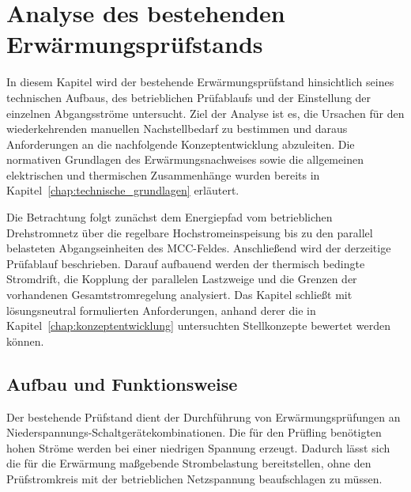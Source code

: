 \section{Analyse des bestehenden Erwärmungsprüfstands}
\label{chap:analyse_pruefstand}

In diesem Kapitel wird der bestehende Erwärmungsprüfstand hinsichtlich seines
technischen Aufbaus, des betrieblichen Prüfablaufs und der Einstellung der
einzelnen Abgangsströme untersucht. Ziel der Analyse ist es, die Ursachen für
den wiederkehrenden manuellen Nachstellbedarf zu bestimmen und daraus
Anforderungen an die nachfolgende Konzeptentwicklung abzuleiten. Die
normativen Grundlagen des Erwärmungsnachweises sowie die allgemeinen
elektrischen und thermischen Zusammenhänge wurden bereits in
Kapitel~\ref{chap:technische_grundlagen} erläutert.

Die Betrachtung folgt zunächst dem Energiepfad vom betrieblichen
Drehstromnetz über die regelbare Hochstromeinspeisung bis zu den parallel
belasteten Abgangseinheiten des MCC-Feldes. Anschließend wird der derzeitige
Prüfablauf beschrieben. Darauf aufbauend werden der thermisch bedingte
Stromdrift, die Kopplung der parallelen Lastzweige und die Grenzen der
vorhandenen Gesamtstromregelung analysiert. Das Kapitel schließt mit
lösungsneutral formulierten Anforderungen, anhand derer die in
Kapitel~\ref{chap:konzeptentwicklung} untersuchten Stellkonzepte
bewertet werden können.


\subsection{Aufbau und Funktionsweise}
\label{sec:aufbau_funktionsweise_pruefstand}

Der bestehende Prüfstand dient der Durchführung von Erwärmungsprüfungen an
Niederspannungs-Schaltgerätekombinationen. Die für den Prüfling benötigten
hohen Ströme werden bei einer niedrigen Spannung erzeugt. Dadurch lässt sich
die für die Erwärmung maßgebende Strombelastung bereitstellen, ohne den
Prüfstromkreis mit der betrieblichen Netzspannung beaufschlagen zu müssen.


